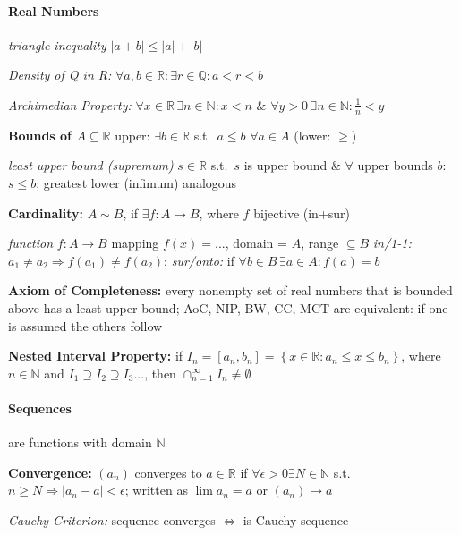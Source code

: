 \documentclass[8pt,twoside]{extarticle}
\begin{document}
\begin{multicols}{2}


\paragraph{Real Numbers}  \textit{triangle inequality} $|a+b| \leq |a| + |b|$

 \textit{Density of Q in R:} $\forall a,b\in\mathbb{R}: \exists r\in \mathbb{Q}: a<r<b$

 \textit{Archimedian Property:} $\forall x {\in} \mathbb{R}\, \exists n{\in}\mathbb{N}: x<n$ \& $\forall y{>}0 \, \exists n{\in}\mathbb{N}: \frac{1}{n}{<}y$


 \textbf{Bounds of $A\subseteq \mathbb{R}$} upper: $\exists b\in \mathbb{R}$ s.t.\ $a\leq b$ $\forall a\in A$ (lower: $\geq$)

 \textit{least upper bound (supremum)} $s \in \mathbb{R}$ s.t.\ $s$ is upper bound \& $\forall$ upper bounds $b$: $s\leq b$; greatest lower (infimum) analogous


 \textbf{Cardinality:} $A\sim B$, if $\exists f:A\to B$, where $f$ bijective (in+sur)

 \textit{function} $f:A\to B$ mapping $f(x)=...$, domain = $A$, range $\subseteq B$
\textit{in/1-1:} $a_1{\neq} a_2 \Rightarrow f(a_1){\neq} f(a_2)$;
\textit{sur/onto:} if $\forall b{\in} B \, \exists a{\in} A: f(a){=}b$


 \textbf{Axiom of Completeness:} every nonempty set of real numbers that is bounded above has a least upper bound; AoC, NIP, BW, CC, MCT are equivalent: if one is assumed the others follow



 \textbf{Nested Interval Property:} if $I_n {=}\left[a_n,b_n\right]{=}\left\{x{\in}\mathbb{R}\!:a_n{\leq} x {\leq} b_n\right\}$, where $n\in \mathbb{N}$ and $I_1\supseteq I_2 \supseteq I_3 ...$, then $\cap_{n=1}^\infty I_n \neq \emptyset$



\paragraph{Sequences} are functions with domain $\mathbb{N}$

 \textbf{Convergence:} $(a_n)$ converges to $a\in\mathbb{R}$ if $\forall \epsilon>0\exists N \in\mathbb{N}$ s.t.\ $n\geq N \Rightarrow |a_n-a|<\epsilon$; written as $\lim a_n = a$ or $(a_n)\to a$

 \textit{Cauchy Criterion:} sequence converges $\Leftrightarrow$ is Cauchy sequence


\end{multicols}
\end{document}
